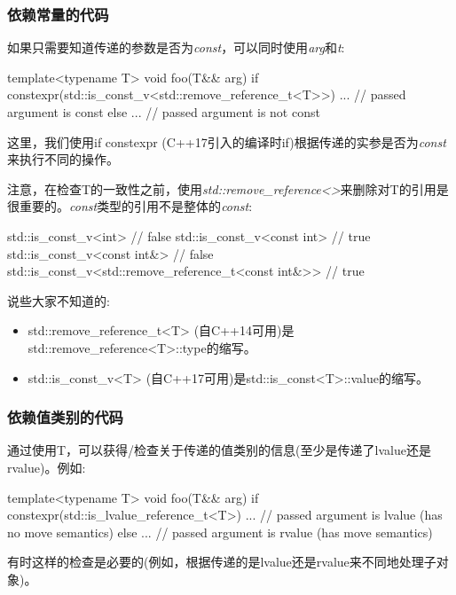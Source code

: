 \subsubsection{依赖常量的代码}

如果只需要知道传递的参数是否为\textit{const}，可以同时使用\textit{arg}和\textit{t}:

\begin{cppcode}
template<typename T>
void foo(T&& arg)
{
	if constexpr(std::is_const_v<std::remove_reference_t<T>>) {
		... // passed argument is const
	}
	else {
		... // passed argument is not const
	}
}
\end{cppcode}

这里，我们使用if constexpr (C++17引入的编译时if)根据传递的实参是否为\textit{const}来执行不同的操作。

注意，在检查T的一致性之前，使用\textit{std::remove_reference<>}来删除对T的引用是很重要的。\textit{const}类型的引用不是整体的\textit{const}:

\begin{cppcode}
std::is_const_v<int> // false
std::is_const_v<const int> // true
std::is_const_v<const int&> // false
std::is_const_v<std::remove_reference_t<const int&>> // true
\end{cppcode}

说些大家不知道的:

\begin{itemize}
	\item std::remove_reference_t<T> (自C++14可用)是std::remove_reference<T>::type的缩写。
	\item std::is_const_v<T> (自C++17可用)是std::is_const<T>::value的缩写。
\end{itemize}

\subsubsection{依赖值类别的代码}

通过使用T，可以获得/检查关于传递的值类别的信息(至少是传递了lvalue还是rvalue)。例如:

\begin{cppcode}
template<typename T>
void foo(T&& arg)
{
	if constexpr(std::is_lvalue_reference_t<T>) {
		... // passed argument is lvalue (has no move semantics)
	}
	else {
		... // passed argument is rvalue (has move semantics)
	}
}
\end{cppcode}

有时这样的检查是必要的(例如，根据传递的是lvalue还是rvalue来不同地处理子对象)。

